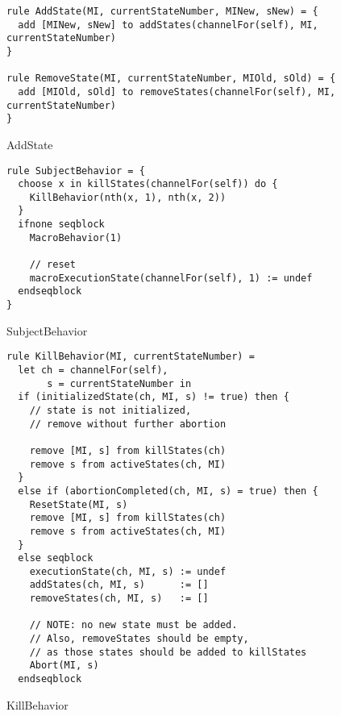 \begin{listing}[H]
\begin{verbatim}
rule AddState(MI, currentStateNumber, MINew, sNew) = {
  add [MINew, sNew] to addStates(channelFor(self), MI, currentStateNumber)
}

rule RemoveState(MI, currentStateNumber, MIOld, sOld) = {
  add [MIOld, sOld] to removeStates(channelFor(self), MI, currentStateNumber)
}
\end{verbatim}
\caption{AddState}
\label{lst:asm:AddState}
\end{listing}







\begin{listing}[H]
\begin{verbatim}
rule SubjectBehavior = {
  choose x in killStates(channelFor(self)) do {
    KillBehavior(nth(x, 1), nth(x, 2))
  }
  ifnone seqblock
    MacroBehavior(1)

    // reset
    macroExecutionState(channelFor(self), 1) := undef
  endseqblock
}
\end{verbatim}
\caption{SubjectBehavior}
\label{lst:asm:SubjectBehavior}
\end{listing}




\begin{listing}[H]
\begin{verbatim}
rule KillBehavior(MI, currentStateNumber) =
  let ch = channelFor(self),
       s = currentStateNumber in
  if (initializedState(ch, MI, s) != true) then {
    // state is not initialized,
    // remove without further abortion

    remove [MI, s] from killStates(ch)
    remove s from activeStates(ch, MI)
  }
  else if (abortionCompleted(ch, MI, s) = true) then {
    ResetState(MI, s)
    remove [MI, s] from killStates(ch)
    remove s from activeStates(ch, MI)
  }
  else seqblock
    executionState(ch, MI, s) := undef
    addStates(ch, MI, s)      := []
    removeStates(ch, MI, s)   := []

    // NOTE: no new state must be added.
    // Also, removeStates should be empty,
    // as those states should be added to killStates
    Abort(MI, s)
  endseqblock
\end{verbatim}
\caption{KillBehavior}
\label{lst:asm:KillBehavior}
\end{listing}




